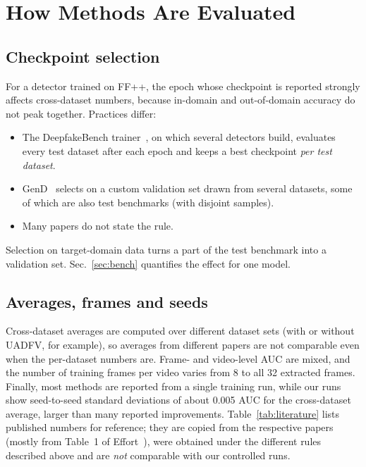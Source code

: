 \documentclass[fonts]{icst}
\begin{document}
\section{How Methods Are Evaluated}
\label{sec:eval}

\subsection{Checkpoint selection}
For a detector trained on FF++, the epoch whose checkpoint is reported strongly affects cross-dataset numbers, because in-domain and out-of-domain accuracy do not peak together. Practices differ:
\begin{itemize}[leftmargin=*, topsep=2pt, itemsep=2pt, label=--]
    \item The DeepfakeBench trainer~\cite{yan2023deepfakebench}, on which several detectors build, evaluates every test dataset after each epoch and keeps a best checkpoint \emph{per test dataset}.
    \item GenD~\cite{yermakov2025gend} selects on a custom validation set drawn from several datasets, some of which are also test benchmarks (with disjoint samples).
    \item Many papers do not state the rule.
\end{itemize}
Selection on target-domain data turns a part of the test benchmark into a validation set. Sec.~\ref{sec:bench} quantifies the effect for one model.

\subsection{Averages, frames and seeds}
Cross-dataset averages are computed over different dataset sets (with or without UADFV, for example), so averages from different papers are not comparable even when the per-dataset numbers are. Frame- and video-level AUC are mixed, and the number of training frames per video varies from 8 to all 32 extracted frames. Finally, most methods are reported from a single training run, while our runs show seed-to-seed standard deviations of about 0.005 AUC for the cross-dataset average, larger than many reported improvements. Table~\ref{tab:literature} lists published numbers for reference; they are copied from the respective papers (mostly from Table~1 of Effort~\cite{yan2025effort}), were obtained under the different rules described above and are \emph{not} comparable with our controlled runs.
\end{document}
